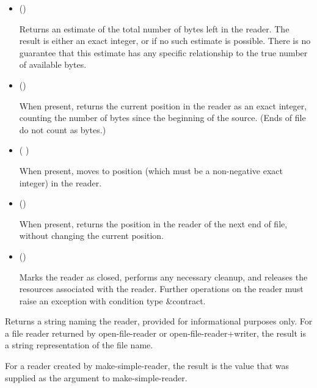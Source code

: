 \begin{entry}{%
}
\begin{itemize}
   may or may not be a bytes object returned by {\cf
    make-i/o-buffer}.
  
   may or may not be the same as the chunk size of the
  reader.

\item {\cf ()}
       
  Returns an estimate of the total number of bytes left in the
  reader. The result is either an exact integer, or
  \schfalse{} if no such estimate is possible. There is no guarantee
  that this estimate has any specific relationship to the true
  number of available bytes.

\item {\cf ()}
       
  When present, 
  returns the current position in the 
  reader as an exact integer, counting the number of bytes since the
  beginning of the source. (Ends of file do not count as bytes.)
  
\item {\cf ( )}
       
  When present,  moves to position  (which
  must be a non-negative exact integer) in the reader.
       
\item {\cf ()}
       
  When present,  returns the position in the reader
  of the next end of file, without changing the current position.

\item {\cf ()}
       
  Marks the reader as closed, performs any necessary
  cleanup, and releases the resources associated with the reader.
  Further operations on the reader must raise an exception with
  condition type {\cf\&contract}.
\end{itemize}

\end{entry}

\begin{entry}{%
}
   
Returns a string naming the reader, provided for informational
purposes only. For a file reader returned by {\cf open-file-reader} or
{\cf open-file-reader+writer}, the result is a string representation of the file
name.
  
For a reader created by {\cf make-simple-reader}, the result is the value that was
supplied as the  argument to {\cf make-simple-reader}.
\end{entry}

